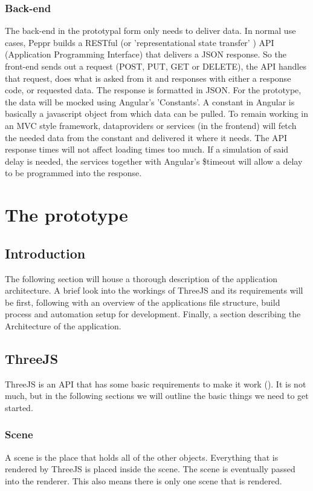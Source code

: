 \subsubsection{Back-end}
\label{subsub: backEnd}
The back-end in the prototypal form only needs to deliver data. In normal use cases, Peppr builds a RESTful (or 'representational state transfer' \cite{RESTful} ) API (Application Programming Interface) that delivers a JSON response. So the front-end sends out a request (POST, PUT, GET or DELETE), the API handles that request, does what is asked from it and responses with either a response code, or requested data. The response is formatted in JSON. 
For the prototype, the data will be mocked using Angular's 'Constants'. A constant in Angular is basically a javascript object from which data can be pulled. To remain working in an MVC style framework, dataproviders or services (in the frontend) will fetch the needed data from the constant and delivered it where it needs. The API response times will not affect loading times too much. If a simulation of said delay is needed, the services together with Angular's \$timeout will allow a delay to be programmed into the response.

\section{The prototype}
\subsection{Introduction}
The following section will house a thorough description of the application architecture. A brief look into the workings of ThreeJS and its requirements will be first, following with an overview of the applications file structure, build process and automation setup for development. Finally, a section describing the Architecture of the application.

\subsection{ThreeJS}
ThreeJS is an API that has some basic requirements to make it work (\cite{ThreeJSgettingStarted}). It is not much, but in the following sections we will outline the basic things we need to get started.
\subsubsection{Scene}
A scene is the place that holds all of the other objects. Everything that is rendered by ThreeJS is placed inside the scene. The scene is eventually passed into the renderer. This also means there is only one scene that is rendered.
